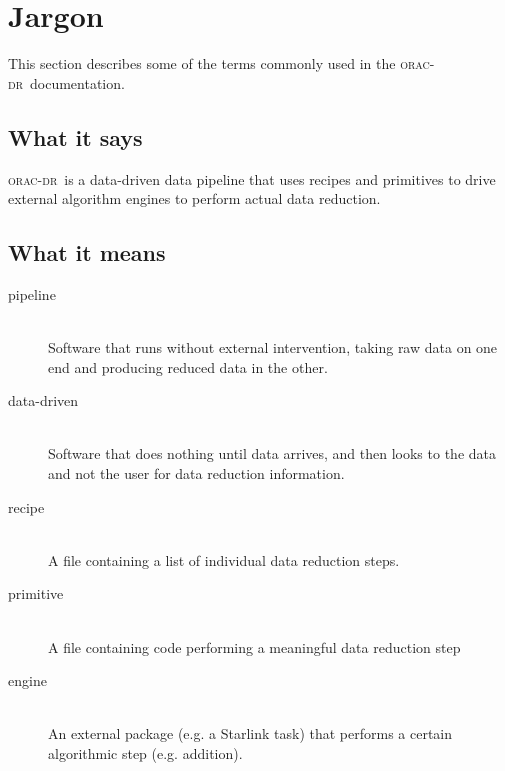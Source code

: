 \documentclass[twoside,11pt]{article}
\newcommand{\xlabel}[1]{}
\renewcommand{\_}{\texttt{\symbol{95}}}
\def\C++{{\rm C\kern-.05em\raise.3ex\hbox{\footnotesize ++}}}
\newcommand{\underscore}{\_}
\newcommand{\oracdr}{\textsc{orac-dr}}
\begin{document}

\section{Jargon\xlabel{jargon}}

This section describes some of the terms commonly used in
the \oracdr\ documentation.

\subsection*{What it says}

\oracdr\ is a data-driven data pipeline that uses recipes and
primitives to drive external algorithm engines to perform actual data
reduction.

\subsection*{What it means}

\begin{description}

\item[pipeline]
\hfil\\
Software that runs without external intervention, taking raw data on
one end and producing reduced data in the other.

\item[data-driven]\hfil\\
Software that does nothing until data arrives, and then looks to 
the data and not the user for data reduction information.

\item[recipe]
\hfil\\
A file containing a list of individual data reduction steps. 

\item[primitive]
\hfil\\
A file containing code performing a meaningful data reduction step

\item[engine]
\hfil\\
An external package (e.g. a Starlink task) that performs a certain
algorithmic step (e.g. addition).

\end{description}
\end{document}
